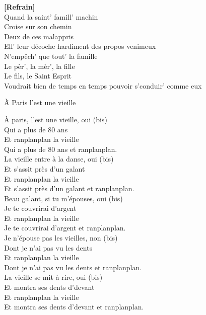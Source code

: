 \documentclass{novel}
\begin{document}
{\begin{minipage}[t][0.55\textheight][t]{\textwidth}
\begin{multicols}{2}
\textbf{[Refrain]}\\

Quand la saint' famill' machin \\
Croise sur son chemin \\
Deux de ces malappris \\
Ell' leur décoche hardiment des propos venimeux \\
N'empêch' que tout' la famille \\
Le pèr', la mèr', la fille \\
Le fils, le Saint Esprit \\
Voudrait bien de temps en temps pouvoir s'conduir' comme eux

\end{multicols}
\end{minipage}


\begin{minipage}[t][0.55\textheight][t]{\textwidth}
\vspace{0.00\textheight}
\h*{À Paris l’est une vieille}
\begin{multicols}{2}
À paris, l'est une vieille, oui (bis) \\
Qui a plus de 80 ans \\
Et ranplanplan la vieille \\
Qui a plus de 80 ans et ranplanplan. \\

La vieille entre à la danse, oui (bis) \\
Et s’assit près d'un galant \\
Et ranplanplan la vieille \\
Et s’assit près d'un galant et ranplanplan. \\

Beau galant, si tu m'épouses, oui (bis) \\
Je te couvrirai d’argent \\
Et ranplanplan la vieille \\
Je te couvrirai d’argent et ranplanplan. \\

Je n'épouse pas les vieilles, non (bis) \\
Dont je n'ai pas vu les dents \\
Et ranplanplan la vieille \\
Dont je n'ai pas vu les dents et ranplanplan. \\

La vieille se mit à rire, oui (bis) \\
Et montra ses dents d'devant \\
Et ranplanplan la vieille \\
Et montra ses dents d'devant et ranplanplan. \\


\end{multicols}
\end{minipage}}
\end{document}
